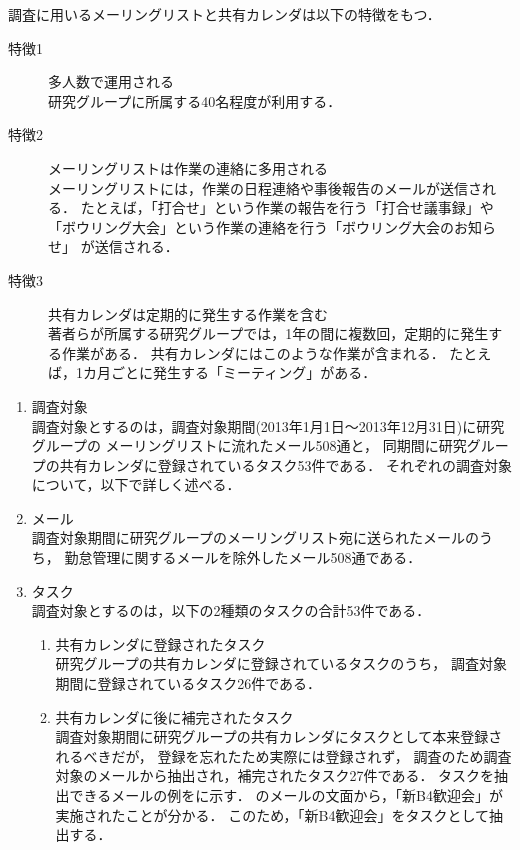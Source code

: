 \documentclass[submit,techreq,noauthor,dvipdfmx]{ipsj}
\begin{document}
調査に用いるメーリングリストと共有カレンダは以下の特徴をもつ．
\begin{description}

\item[特徴1] 多人数で運用される\\
研究グループに所属する40名程度が利用する．

\item[特徴2] メーリングリストは作業の連絡に多用される\\
メーリングリストには，作業の日程連絡や事後報告のメールが送信される．
たとえば，「打合せ」という作業の報告を行う「打合せ議事録」や
「ボウリング大会」という作業の連絡を行う「ボウリング大会のお知らせ」
が送信される．

\item[特徴3] 共有カレンダは定期的に発生する作業を含む\\
著者らが所属する研究グループでは，1年の間に複数回，定期的に発生する作業がある．
共有カレンダにはこのような作業が含まれる．
たとえば，1カ月ごとに発生する「ミーティング」がある．

\end{description}

\begin{enumerate}

\item 調査対象\\
調査対象とするのは，調査対象期間(2013年1月1日〜2013年12月31日)に研究グループの
メーリングリストに流れたメール508通と，
同期間に研究グループの共有カレンダに登録されているタスク53件である．
それぞれの調査対象について，以下で詳しく述べる．

\item メール\\
調査対象期間に研究グループのメーリングリスト宛に送られたメールのうち，
勤怠管理に関するメールを除外したメール508通である．

\item タスク\\
調査対象とするのは，以下の2種類のタスクの合計53件である．
\begin{enumerate}

\item 共有カレンダに登録されたタスク\\
研究グループの共有カレンダに登録されているタスクのうち，
調査対象期間に登録されているタスク26件である．

\item 共有カレンダに後に補完されたタスク\\
調査対象期間に研究グループの共有カレンダにタスクとして本来登録されるべきだが，
登録を忘れたため実際には登録されず，
調査のため調査対象のメールから抽出され，補完されたタスク27件である．
タスクを抽出できるメールの例をに示す．
のメールの文面から，「新B4歓迎会」が実施されたことが分かる．
このため，「新B4歓迎会」をタスクとして抽出する．

\end{enumerate}


\end{enumerate}
\end{document}

